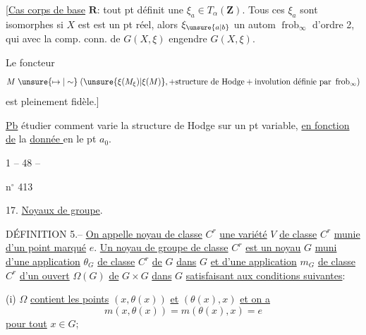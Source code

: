 [\uline{Cas corps de base} $\mathbf R$: tout pt   définit une $\xi_a\in T_\alpha(\mathbf Z)$.
Tous ces $\xi_a$ sont isomorphes  si  $X$ est
 est un pt réel, alors $\xi_{\unsure{a|b}}$  un autom $\operatorname{frob}_\infty$ d'ordre 2, qui avec la comp. conn. de $G(X,\xi)$ engendre $G(X,\xi)$.


Le foncteur
\[
M\mathrel{\unsure{\mapsto|\sim}}
(\unsure{\xi(M_\xi)|\xi(M)},+\text{structure de Hodge}+\text{involution définie par }\operatorname{frob}_\infty)
\]
est pleinement fidèle.]

\uline{Pb} étudier comment varie la structure de Hodge sur un pt  variable,
\uline{en fonction de} la \uline{donnée } en le pt $a_0$.

\begin{center}1 -- 48 --\end{center}\hfill n$^\circ$ 413

17. \uline{Noyaux de groupe}.

DÉFINITION 5.-- \uline{On appelle noyau de classe} $C^r$ \uline{une variété} $V$ \uline{de classe} $C^r$ \uline{munie d'un point marqué} $e$.
\uline{Un noyau de groupe de classe} $C^r$ \uline{est un noyau} $G$ \uline{muni d'une application} $\theta_G$ \uline{de classe} $C^r$ \uline{de} $G$ \uline{dans} $G$ \uline{et d'une application} $m_G$ \uline{de classe} $C^r$ \uline{d'un ouvert} $\Omega(G)$ \uline{de} $G\times G$ \uline{dans} $G$ \uline{satisfaisant aux conditions suivantes}:

(i) $\Omega$ \uline{contient les points} $(x,\theta(x))$ \uline{et} $(\theta(x),x)$ \uline{et on a}
\[
\tag{36}m(x,\theta(x))=m(\theta(x),x)=e
\]
\uline{pour tout} $x\in G$;


